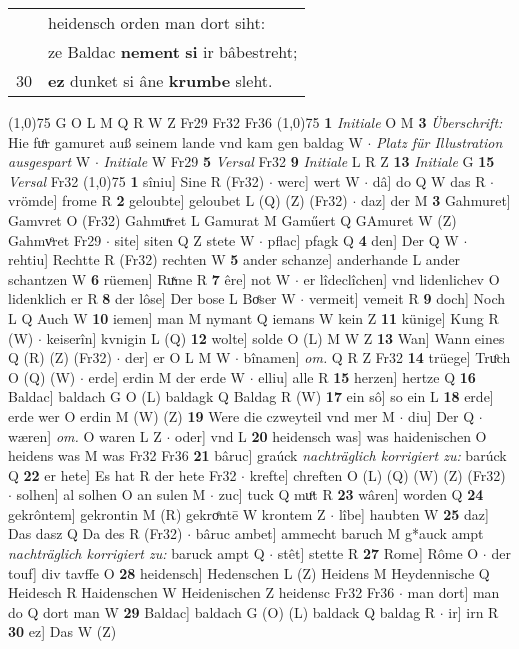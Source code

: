 \documentclass[8pt,a4paper,notitlepage]{article}
\begin{document}
\begin{table}[ht]
\begin{minipage}[t]{0.5\linewidth}
\begin{tabular}{rl}
 & heidensch orden man dort siht:\\ 
 & ze Baldac \textbf{nement} \textbf{si} ir bâbestreht;\\ 
30 & \textbf{ez} dunket si âne \textbf{krumbe} sleht.\\ 
\end{tabular}
\scriptsize
\line(1,0){75} \newline
G O L M Q R W Z Fr29 Fr32 Fr36 \newline
\line(1,0){75} \newline
\textbf{1} \textit{Initiale} O M  \textbf{3} \textit{Überschrift:} Hie fuͦr gamuret auß seinem lande vnd kam gen baldag W   $\cdot$ \textit{Platz für Illustration ausgespart} W   $\cdot$ \textit{Initiale} W Fr29  \textbf{5} \textit{Versal} Fr32  \textbf{9} \textit{Initiale} L R Z  \textbf{13} \textit{Initiale} G  \textbf{15} \textit{Versal} Fr32  \newline
\line(1,0){75} \newline
\textbf{1} sîniu] Sine R (Fr32)  $\cdot$ werc] wert W  $\cdot$ dâ] do Q W das R  $\cdot$ vrömde] frome R \textbf{2} geloubte] geloubet L (Q) (Z) (Fr32)  $\cdot$ daz] der M \textbf{3} Gahmuret] Gamvret O (Fr32) Gahmuͯret L Gamurat M Gaműert Q GAmuret W (Z) Gahmvͦret Fr29  $\cdot$ site] siten Q Z stete W  $\cdot$ pflac] pfagk Q \textbf{4} den] Der Q W  $\cdot$ rehtiu] Rechtte R (Fr32) rechten W \textbf{5} ander schanze] anderhande L ander schantzen W \textbf{6} rüemen] Ruͯme R \textbf{7} êre] not W  $\cdot$ er lîdeclîchen] vnd lidenlichev O lidenklich er R \textbf{8} der lôse] Der bose L Boͤser W  $\cdot$ vermeit] vemeit R \textbf{9} doch] Noch L Q Auch W \textbf{10} iemen] man M nymant Q iemans W kein Z \textbf{11} künige] Kung R (W)  $\cdot$ keiserîn] kvnigin L (Q) \textbf{12} wolte] solde O (L) M W Z \textbf{13} Wan] Wann eines Q (R) (Z) (Fr32)  $\cdot$ der] er O L M W  $\cdot$ bînamen] \textit{om.} Q R Z Fr32 \textbf{14} trüege] Truͦch O (Q) (W)  $\cdot$ erde] erdin M der erde W  $\cdot$ elliu] alle R \textbf{15} herzen] hertze Q \textbf{16} Baldac] baldach G O (L) baldagk Q Baldag R (W) \textbf{17} ein sô] so ein L \textbf{18} erde] erde wer O erdin M (W) (Z) \textbf{19} Were die czweyteil vnd mer M  $\cdot$ diu] Der Q  $\cdot$ wæren] \textit{om.} O waren L Z  $\cdot$ oder] vnd L \textbf{20} heidensch was] was haidenischen O heidens was M was Fr32 Fr36 \textbf{21} bâruc] graúck \textit{nachträglich korrigiert zu:} barúck Q \textbf{22} er hete] Es hat R der hete Fr32  $\cdot$ krefte] chreften O (L) (Q) (W) (Z) (Fr32)  $\cdot$ solhen] al solhen O an sulen M  $\cdot$ zuc] tuck Q muͦt R \textbf{23} wâren] worden Q \textbf{24} gekrôntem] gekrontin M (R) gekroͤntē W krontem Z  $\cdot$ lîbe] haubten W \textbf{25} daz] Das dasz Q Da des R (Fr32)  $\cdot$ bâruc ambet] ammecht baruch M g*auck ampt \textit{nachträglich korrigiert zu:} baruck ampt Q  $\cdot$ stêt] stette R \textbf{27} Rome] Rôme O  $\cdot$ der touf] div tavffe O \textbf{28} heidensch] Hedenschen L (Z) Heidens M Heydennische Q Heidesch R Haidenschen W Heidenischen Z heidensc Fr32 Fr36  $\cdot$ man dort] man do Q dort man W \textbf{29} Baldac] baldach G (O) (L) baldack Q baldag R  $\cdot$ ir] irn R \textbf{30} ez] Das W (Z) \newline

\end{minipage}
\end{table}
\end{document}
